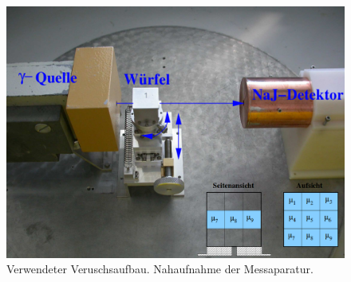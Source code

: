 \begin{figure}[h]
  \includegraphics[width=\textwidth]{Pics/Aufbau.png}
  \caption{Verwendeter Veruschsaufbau. Nahaufnahme der Messaparatur.}
  \label{fig:aufbau}
\end{figure}
